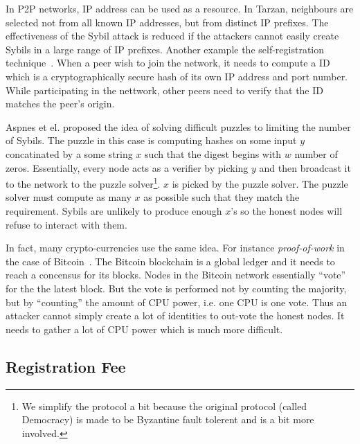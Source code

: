 
In P2P networks, IP address can be used as a resource. In
Tarzan\cite{freedman2002tarzan}, neighbours are selected not from all known IP
addresses, but from distinct IP prefixes. The effectiveness of the Sybil attack
is reduced if the attackers cannot easily create Sybils in a large range of IP
prefixes. Another example the self-registration
technique~\cite{dinger2006defending}. When a peer wish to join the network, it
needs to compute a ID which is a cryptographically secure hash of its own IP
address and port number. While participating in the nettwork, other peers need
to verify that the ID matches the peer's origin.

Aspnes et el. proposed the idea of solving difficult puzzles to limiting the
number of Sybils\cite{aspnes2005exposing}. The puzzle in this case is computing
hashes on some input $y$ concatinated by a some string $x$ such that the digest
begins with $w$ number of zeros. Essentially, every node acts as a verifier by
picking $y$ and then broadcast it to the network to the puzzle
solver\footnote{We simplify the protocol a bit because the original protocol
  (called Democracy) is made to be Byzantine fault tolerent and is a bit more
  involved.}. $x$ is picked by the puzzle solver. The puzzle solver must compute
as many $x$ as possible such that they match the requirement. Sybils are
unlikely to produce enough $x$'s so the honest nodes will refuse to interact
with them.

In fact, many crypto-currencies use the same idea. For instance
\emph{proof-of-work} in the case of Bitcoin~\cite{nakamoto2008bitcoin}. The
Bitcoin blockchain is a global ledger and it needs to reach a concensus for its
blocks. Nodes in the Bitcoin network essentially ``vote'' for the the latest
block. But the vote is performed not by counting the majority, but by
``counting'' the amount of CPU power, i.e. one CPU is one vote. Thus an attacker
cannot simply create a lot of identities to out-vote the honest nodes. It needs
to gather a lot of CPU power which is much more difficult.


\subsection{Registration Fee}\label{sec:registration-fee}

